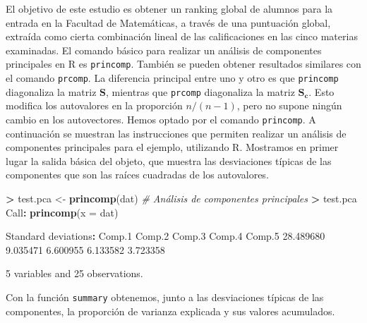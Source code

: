 \documentclass[
  a4paper,
  oneside]{scrbook}
\newenvironment{Shaded}{\begin{snugshade}}{\end{snugshade}}
\newcommand{\AttributeTok}[1]{\textcolor[rgb]{0.13,0.29,0.53}{#1}}
\newcommand{\CommentTok}[1]{\textcolor[rgb]{0.56,0.35,0.01}{\textit{#1}}}
\newcommand{\DecValTok}[1]{\textcolor[rgb]{0.00,0.00,0.81}{#1}}
\newcommand{\FloatTok}[1]{\textcolor[rgb]{0.00,0.00,0.81}{#1}}
\newcommand{\FunctionTok}[1]{\textcolor[rgb]{0.13,0.29,0.53}{\textbf{#1}}}
\newcommand{\NormalTok}[1]{#1}
\newcommand{\OtherTok}[1]{\textcolor[rgb]{0.56,0.35,0.01}{#1}}
\newcommand{\SpecialCharTok}[1]{\textcolor[rgb]{0.81,0.36,0.00}{\textbf{#1}}}
\theoremstyle{definition}
\theoremstyle{definition}
\theoremstyle{definition}
\theoremstyle{definition}
\theoremstyle{remark}
\begin{document}
\normalsize

El objetivo de este estudio es obtener un ranking global de alumnos para
la entrada en la Facultad de Matemáticas, a través de una puntuación
global, extraída como cierta combinación lineal de las calificaciones en
las cinco materias examinadas. El comando básico para realizar un análisis de componentes principales
en R es \texttt{princomp}. También se pueden obtener resultados similares con
el comando \texttt{prcomp}. La diferencia principal entre uno y otro es que
\texttt{princomp} diagonaliza la matriz \(\bm{S}\), mientras que \texttt{prcomp}
diagonaliza la matriz \(\bm{S_c}\). Esto modifica los autovalores en la
proporción \(n/(n-1)\), pero no supone ningún cambio en los autovectores.
Hemos optado por el comando \texttt{princomp}. A continuación se muestran las
instrucciones que permiten realizar un análisis de componentes
principales para el ejemplo, utilizando R. Mostramos en primer lugar la salida básica del objeto, que muestra las
desviaciones típicas de las componentes que son las raíces cuadradas de
los autovalores.

\footnotesize

\begin{Shaded}
\begin{Highlighting}[]
\SpecialCharTok{\textgreater{}}\NormalTok{ test.pca }\OtherTok{\textless{}{-}} \FunctionTok{princomp}\NormalTok{(dat)  }\CommentTok{\# Análisis de componentes principales}
\SpecialCharTok{\textgreater{}}\NormalTok{ test.pca}
\NormalTok{Call}\SpecialCharTok{:}
\FunctionTok{princomp}\NormalTok{(}\AttributeTok{x =}\NormalTok{ dat)}

\NormalTok{Standard deviations}\SpecialCharTok{:}
\NormalTok{   Comp}\FloatTok{.1}\NormalTok{    Comp}\FloatTok{.2}\NormalTok{    Comp}\FloatTok{.3}\NormalTok{    Comp}\FloatTok{.4}\NormalTok{    Comp}\FloatTok{.5} 
\FloatTok{28.489680}  \FloatTok{9.035471}  \FloatTok{6.600955}  \FloatTok{6.133582}  \FloatTok{3.723358} 

 \DecValTok{5}\NormalTok{  variables and  }\DecValTok{25}\NormalTok{ observations.}
\end{Highlighting}
\end{Shaded}

\normalsize

Con la función \texttt{summary} obtenemos, junto a las desviaciones típicas de
las componentes, la proporción de varianza explicada y sus valores
acumulados.

\footnotesize
\end{document}
